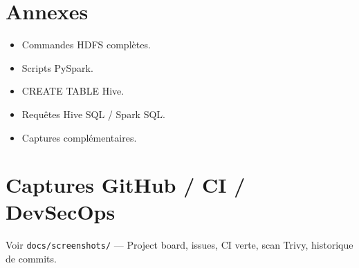 \appendix
\section{Annexes}
\begin{itemize}
  \item Commandes HDFS complètes.
  \item Scripts PySpark.
  \item CREATE TABLE Hive.
  \item Requêtes Hive SQL / Spark SQL.
  \item Captures complémentaires.
\end{itemize}

\section{Captures GitHub / CI / DevSecOps}
Voir \texttt{docs/screenshots/} — Project board, issues, CI verte, scan
Trivy, historique de commits.
